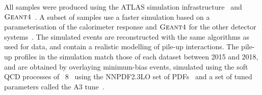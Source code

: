 \documentclass[letterpaper,12pt]{article}
\begin{document}



All samples were 
produced using the ATLAS simulation infrastructure~\cite{SOFT-2010-01}
and $\textsc{Geant}4$~\cite{Agostinelli:2002hh}. A subset of samples use a faster 
simulation based on a parameterisation of the calorimeter response and 
$\textsc{Geant}4$ for the other detector systems~\cite{SOFT-2010-01}. %
The simulated events are reconstructed with the same algorithms as
used for data, and contain a realistic modelling of pile-up
interactions. The pile-up profiles in the simulation match those of each dataset
between 2015 and 2018, and are obtained by overlaying minimum-bias events,
simulated using the soft QCD processes of
{\PYTHIA}~8~\cite{Sjostrand:2014zea} using the NNPDF2.3LO set of
PDFs~\cite{Ball:2012cx} and a set of tuned
parameters called the A3 tune~\cite{ATL-PHYS-PUB-2016-017}.
\end{document}
